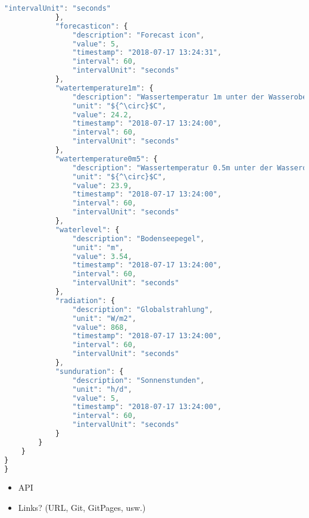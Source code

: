 \begin{lstlisting}[label=lst:JsonTree,caption=Json Struktur, language=JavaScript, style=htmlcssjs, mathescape]
                "intervalUnit": "seconds"
            },
            "forecasticon": {
                "description": "Forecast icon",
                "value": 5,
                "timestamp": "2018-07-17 13:24:31",
                "interval": 60,
                "intervalUnit": "seconds"
            },
            "watertemperature1m": {
                "description": "Wassertemperatur 1m unter der Wasseroberfläche",
                "unit": "${^\circ}$C",
                "value": 24.2,
                "timestamp": "2018-07-17 13:24:00",
                "interval": 60,
                "intervalUnit": "seconds"
            },
            "watertemperature0m5": {
                "description": "Wassertemperatur 0.5m unter der Wasseroberfläche",
                "unit": "${^\circ}$C",
                "value": 23.9,
                "timestamp": "2018-07-17 13:24:00",
                "interval": 60,
                "intervalUnit": "seconds"
            },
            "waterlevel": {
                "description": "Bodenseepegel",
                "unit": "m",
                "value": 3.54,
                "timestamp": "2018-07-17 13:24:00",
                "interval": 60,
                "intervalUnit": "seconds"
            },
            "radiation": {
                "description": "Globalstrahlung",
                "unit": "W/m2",
                "value": 868,
                "timestamp": "2018-07-17 13:24:00",
                "interval": 60,
                "intervalUnit": "seconds"
            },
            "sunduration": {
                "description": "Sonnenstunden",
                "unit": "h/d",
                "value": 5,
                "timestamp": "2018-07-17 13:24:00",
                "interval": 60,
                "intervalUnit": "seconds"
            }
        }
    }
}
}
\end{lstlisting}


\begin{itemize}
	\item API
	\item Links? (URL, Git, GitPages, usw.)
\end{itemize}
